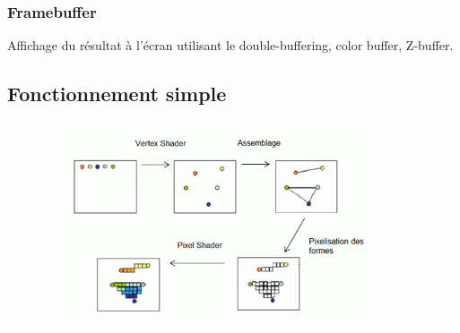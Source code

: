 \subsubsection{Framebuffer}
Affichage du résultat à l’écran utilisant le double-buffering, color buffer, Z-buffer.

\subsection{Fonctionnement simple}
\includegraphics[width=12cm,height=60mm]{leo/images/pipelineSimple.png}
